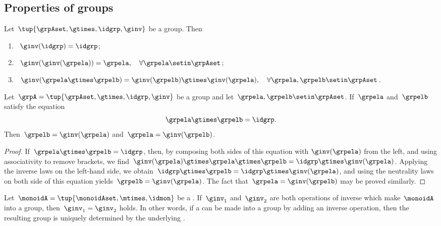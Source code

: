 
\subsection{Properties of groups}

\begin{lemma}
    \label{lem:inv-op-properties}
    Let~$\tup{\grpAset, \gtimes, \idgrp, \ginv}$ be a group.
    Then
    \begin{enumerate}
        \item\label{eq:group-neutral-invariant}~$\ginv(\idgrp) = \idgrp$;
        \item\label{eq:group-inverse-inverse}~$ \ginv(\ginv(\grpela)) = \grpela, \quad \forall \grpela \setin \grpAset$;
        \item\label{eq:group-inverse-of-composition}~$\ginv(\grpela \gtimes \grpelb ) = \ginv(\grpelb) \gtimes \ginv(\grpela), \quad \forall \grpela, \grpelb \setin \grpAset$.
    \end{enumerate}
\end{lemma}

\begin{lemma}
    \label{lem:inv-op-unique}
    Let~$\grpA = \tup{ \grpAset, \gtimes, \idgrp, \ginv }$ be a group and let~$\grpela, \grpelb \setin \grpAset$.
    If~$\grpela$ and~$\grpelb$ satisfy the equation
    \begin{equation}
        \grpela \gtimes \grpelb = \idgrp.
    \end{equation}
    Then~$\grpelb = \ginv( \grpela )$ and~$\grpela = \ginv(\grpelb)$.
\end{lemma}

\begin{proof}
    If~$\grpela \gtimes \grpelb = \idgrp$, then, by composing both sides of this equation with $\ginv(\grpela)$ from the left, and using associativity to remove brackets, we find~$\ginv(\grpela) \gtimes \grpela \gtimes \grpelb = \idgrp \gtimes \ginv(\grpela)$.
    Applying the inverse laws on the left-hand side, we obtain~$\idgrp \gtimes \grpelb = \idgrp \gtimes \ginv(\grpela)$, and using the neutrality laws on both side of this equation yields~$\grpelb =  \ginv(\grpela)$.
    The fact that~$\grpela = \ginv(\grpelb)$ may be proved similarly.
\end{proof}

\begin{corollary}
    \label{cor:inv-op-unique}
    Let~$\monoidA = \tup{\monoidAset, \mtimes,  \idmon }$ be a .
    If~$\ginv_1$ and~$\ginv_2$ are both operations of inverse which make~$\monoidA$ into a group, then~$\ginv_1 =\ginv_2$ holds.
    In other words, if a  can be made into a group by adding an inverse operation, then the resulting group is uniquely determined by the underlying .
\end{corollary}

